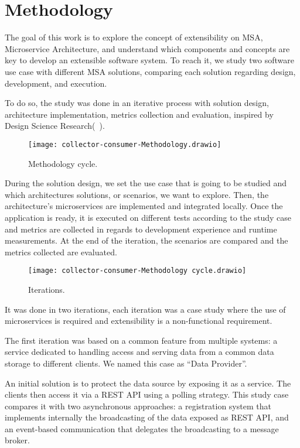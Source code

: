 \chapter{Methodology}

The goal of this work is to explore the concept of extensibility on MSA, Microservice Architecture, and understand which components and concepts are key to develop an extensible software system. To reach it, we study two software use case with different MSA solutions, comparing each solution regarding design, development, and execution.

To do so, the study was done in an iterative process with solution design, architecture implementation, metrics collection and evaluation, inspired by Design Science Research(~\cite{DesignParad}).

\begin{figure}
    \centering
    \texttt{[image: collector-consumer-Methodology.drawio]}
    \caption{Methodology cycle.\label{fig:subfigures1}}
\end{figure}

During the solution design, we set the use case that is going to be studied and which architectures solutions, or scenarios, we want to explore. Then, the architecture's microservices are implemented and integrated locally. Once the application is ready, it is executed on different tests according to the study case and metrics are collected in regards to development experience and runtime measurements. At the end of the iteration, the scenarios are compared and the metrics collected are evaluated.

\begin{figure}
    \centering
    \texttt{[image: collector-consumer-Methodology cycle.drawio]}
    \caption{Iterations.\label{fig:subfigures2}}
\end{figure}

It was done in two iterations, each iteration was a case study where the use of microservices is required and extensibility is a non-functional requirement.

The first iteration was based on a common feature from multiple systems: a service dedicated to handling access and serving data from a common data storage to different clients. We named this case as “Data Provider”.

An initial solution is to protect the data source by exposing it as a service. The clients then access it via a REST API using a polling strategy. This study case compares it with two asynchronous approaches: a registration system that implements internally the broadcasting of the data exposed as REST API, and an event-based communication that delegates the broadcasting to a message broker.

